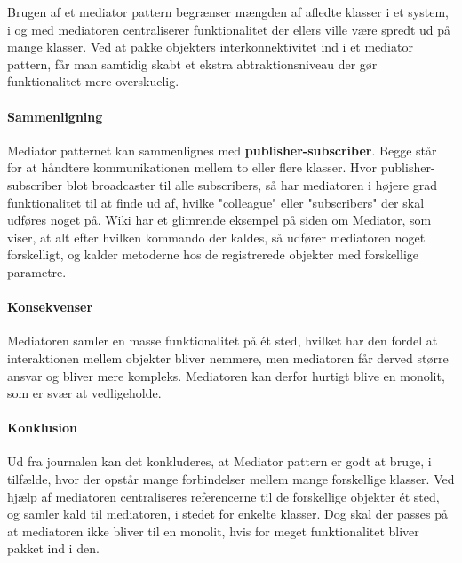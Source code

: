 Brugen af et mediator pattern begrænser mængden af afledte klasser i et system, i og med mediatoren centraliserer funktionalitet der ellers ville være spredt ud på mange klasser. Ved at pakke objekters interkonnektivitet ind i et mediator pattern, får man samtidig skabt et ekstra abtraktionsniveau der gør funktionalitet mere overskuelig.

\paragraph{Sammenligning}

Mediator patternet kan sammenlignes med \textbf{publisher-subscriber}. Begge står for at håndtere kommunikationen mellem to eller flere klasser. Hvor publisher-subscriber blot broadcaster til alle subscribers, så har mediatoren i højere grad funktionalitet til at finde ud af, hvilke "colleague" eller "subscribers" der skal udføres noget på. Wiki har et glimrende eksempel på siden om Mediator, som viser, at alt efter hvilken kommando der kaldes, så udfører mediatoren noget forskelligt, og kalder metoderne hos de registrerede objekter med forskellige parametre.

\paragraph{Konsekvenser}
Mediatoren samler en masse funktionalitet på ét sted, hvilket har den fordel at interaktionen mellem objekter bliver nemmere, men mediatoren får derved større ansvar og bliver mere kompleks. Mediatoren kan derfor hurtigt blive en monolit, som er svær at vedligeholde.

\paragraph{Konklusion}
Ud fra journalen kan det konkluderes, at Mediator pattern er godt at bruge, i tilfælde, hvor der opstår mange forbindelser mellem mange forskellige klasser. Ved hjælp af mediatoren centraliseres referencerne til de forskellige objekter ét sted, og samler kald til mediatoren, i stedet for enkelte klasser. Dog skal der passes på at mediatoren ikke bliver til en monolit, hvis for meget funktionalitet bliver pakket ind i den.

